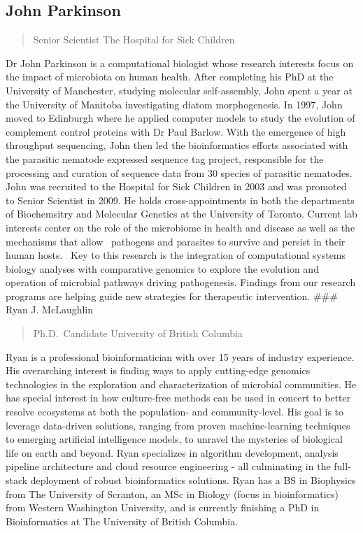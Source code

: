 \documentclass[
]{book}
\begin{document}
\subsection{John Parkinson}\label{john-parkinson}

\begin{quote}
Senior Scientist
The Hospital for Sick Children
\end{quote}

Dr John Parkinson is a computational biologist whose research interests focus on the impact of microbiota on human health. After completing his PhD at the University of Manchester, studying molecular self-assembly, John spent a year at the University of Manitoba investigating diatom morphogenesis. In 1997, John moved to Edinburgh where he applied computer models to study the evolution of complement control proteins with Dr Paul Barlow. With the emergence of high throughput sequencing, John then led the bioinformatics efforts associated with the parasitic nematode expressed sequence tag project, responsible for the processing and curation of sequence data from 30 species of parasitic nematodes. John was recruited to the Hospital for Sick Children in 2003 and was promoted to Senior Scientist in 2009. He holds cross-appointments in both the departments of Biochemsitry and Molecular Genetics at the University of Toronto. Current lab interests center on the role of the microbiome in health and disease as well as the mechanisms that allow~ pathogens and parasites to survive and persist in their human hosts.~ Key to this research is the integration of computational systems biology analyses with comparative genomics to explore the evolution and operation of microbial pathways driving pathogenesis. Findings from our research programs are helping guide new strategies for therapeutic intervention.
\#\#\# Ryan J. McLaughlin

\begin{quote}
Ph.D.~Candidate
University of British Columbia
\end{quote}

Ryan is a professional bioinformatician with over 15 years of industry experience. His overarching interest is finding ways to apply cutting-edge genomics technologies in the exploration and characterization of microbial communities. He has special interest in how culture-free methods can be used in concert to better resolve ecosystems at both the population- and community-level. His goal is to leverage data-driven solutions, ranging from proven machine-learning techniques to emerging artificial intelligence models, to unravel the mysteries of biological life on earth and beyond. Ryan specializes in algorithm development, analysis pipeline architecture and cloud resource engineering - all culminating in the full-stack deployment of robust bioinformatics solutions. Ryan has a BS in Biophysics from The University of Scranton, an MSc in Biology (focus in bioinformatics) from Western Washington University, and is currently finishing a PhD in Bioinformatics at The University of British Columbia.
\end{document}
